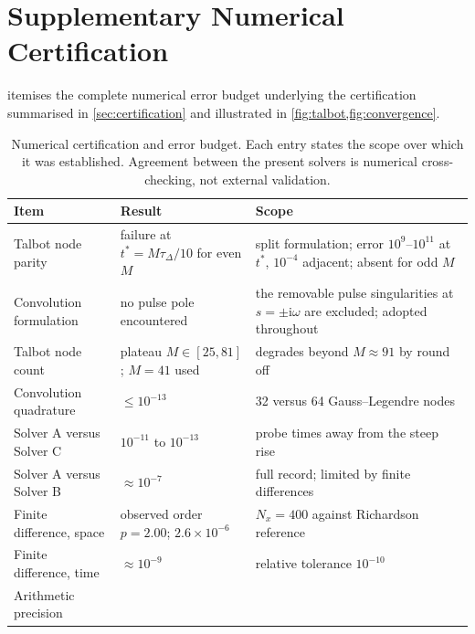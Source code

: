 \documentclass[preprint,12pt,a4paper]{elsarticle}
\theoremstyle{plain}
\theoremstyle{definition}
\theoremstyle{remark}
\begin{document}
\clearpage
\section{Supplementary Numerical Certification}
\setcounter{table}{0}
\label{app:certification}

 itemises the complete numerical error budget
underlying the certification summarised in \cref{sec:certification} and
illustrated in \cref{fig:talbot,fig:convergence}.


\begin{table}[htbp]
  \centering
  \caption{Numerical certification and error budget. Each entry states the
           scope over which it was established. Agreement between the present
           solvers is numerical cross-checking, not external validation.}
  \label{tab:certification}
  \small
  \begin{tabularx}{\textwidth}{@{}p{4.3cm}p{3.5cm}X@{}}
    \toprule
    \textbf{Item} & \textbf{Result} & \textbf{Scope} \\
    \midrule
    Talbot node parity
      & failure at $t^{\ast}=M\tau_{\Delta}/10$ for even $M$
      & split formulation; error $10^{9}$--$10^{11}$ at $t^{\ast}$,
        $10^{-4}$ adjacent; absent for odd $M$ \\
    \addlinespace
    Convolution formulation
  & no pulse pole encountered
  & the removable pulse singularities at
    $s=\pm\mathrm{i}\omega$ are excluded; adopted throughout \\
    \addlinespace
    Talbot node count
      & plateau $M\in[25,81]$; $M=41$ used
      & degrades beyond $M\approx 91$ by round off \\
    \addlinespace
    Convolution quadrature
      & $\leq 10^{-13}$
      & 32 versus 64 Gauss--Legendre nodes \\
    \addlinespace
    Solver A versus Solver C
      & $10^{-11}$ to $10^{-13}$
      & probe times away from the steep rise \\
    \addlinespace
    Solver A versus Solver B
      & $\approx 10^{-7}$
      & full record; limited by finite differences \\
    \addlinespace
    Finite difference, space
      & observed order $p=2.00$; $2.6\times10^{-6}$
      & $N_{x}=400$ against Richardson reference \\
    \addlinespace
    Finite difference, time
      & $\approx 10^{-9}$
      & relative tolerance $10^{-10}$ \\
    \addlinespace
    Arithmetic precision

\end{tabularx}
\end{table}
\end{document}
